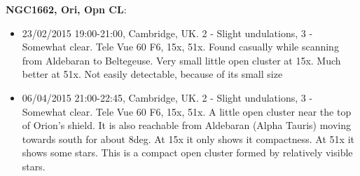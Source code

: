 {\bf NGC1662, Ori, Opn CL}:
\begin{itemize}
\item 23/02/2015 19:00-21:00, Cambridge, UK. 2 - Slight undulations, 3 - Somewhat clear. Tele Vue 60 F6, 15x, 51x. Found casually while scanning from Aldebaran to Beltegeuse. Very small little open cluster at 15x. Much better at 51x. Not easily detectable, because of its small size
\item 06/04/2015 21:00-22:45, Cambridge, UK. 2 - Slight undulations, 3 - Somewhat clear. Tele Vue 60 F6, 15x, 51x. A little open cluster near the top of Orion's shield. It is also reachable from Aldebaran (Alpha Tauris) moving towards south for about 8deg. At 15x it only shows it compactness. At 51x it shows some stars. This is a compact open cluster formed by relatively visible stars.  
\end{itemize}
